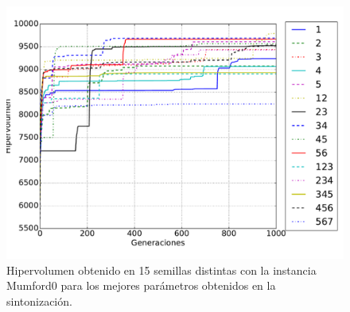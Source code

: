 \begin{figure}[!htb]
\centering
\includegraphics[width=\textwidth]{img/hyp_Mumford0}
\caption{Hipervolumen obtenido en 15 semillas distintas con la instancia Mumford0 para los mejores parámetros obtenidos en la sintonización.}
\label{fig:mumford0}
\end{figure}

